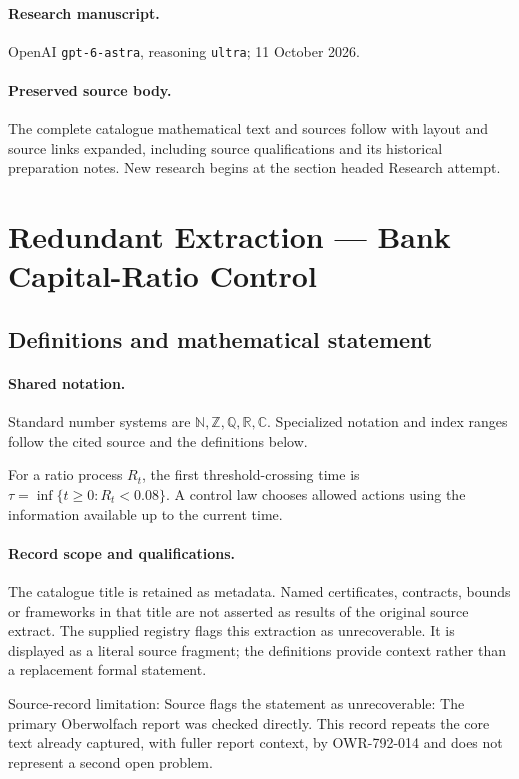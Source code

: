 \documentclass[11pt]{article}
\begin{document}
\paragraph{Research manuscript.} OpenAI \texttt{gpt-6-astra}, reasoning \texttt{ultra}; 11 October 2026.
\paragraph{Preserved source body.} The complete catalogue mathematical text and sources follow with layout and source links expanded, including source qualifications and its historical preparation notes. New research begins at the section headed Research attempt.

\section{Redundant Extraction — Bank Capital-Ratio Control}\label{statement}

\subsection{Definitions and mathematical statement}

\paragraph{Shared notation.}Standard number systems are $\mathbb N,\mathbb Z,\mathbb Q,\mathbb R,\mathbb C$. Specialized notation and index ranges follow the cited source and the definitions below.


For a ratio process $R_t$, the first threshold-crossing time is $\tau=\inf\{t\geq0:R_t<0.08\}$. A control law chooses allowed actions using the information available up to the current time.
\paragraph{Record scope and qualifications.}
The catalogue title is retained as metadata. Named certificates, contracts, bounds or frameworks in that title are not asserted as results of the original source extract.
The supplied registry flags this extraction as unrecoverable. It is displayed as a literal source fragment; the definitions provide context rather than a replacement formal statement.

Source-record limitation: Source flags the statement as unrecoverable: The primary Oberwolfach report was checked directly. This record repeats the core text already captured, with fuller report context, by OWR-792-014 and does not represent a second open problem.
\end{document}
